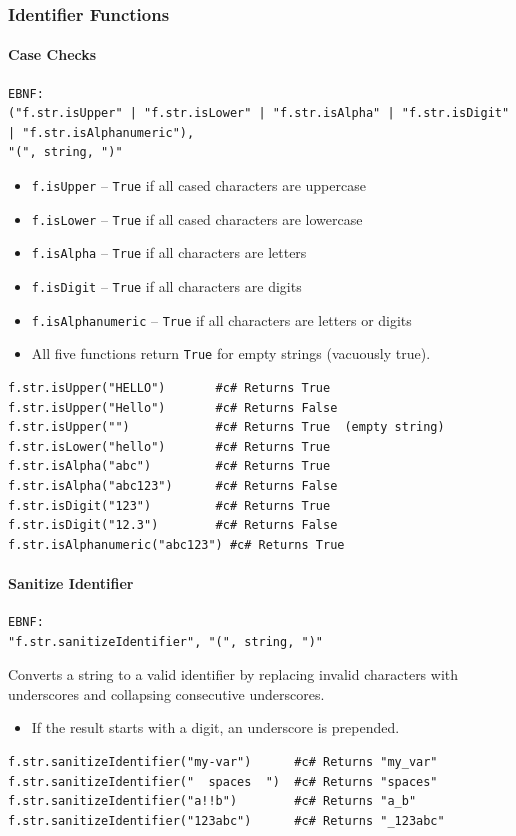 \subsubsection{Identifier Functions}
\paragraph{Case Checks}
\begin{verbatim}
EBNF:
("f.str.isUpper" | "f.str.isLower" | "f.str.isAlpha" | "f.str.isDigit" | "f.str.isAlphanumeric"),
"(", string, ")"
\end{verbatim}
\begin{itemize}
\item \texttt{f.isUpper} -- \texttt{True} if all cased characters are uppercase
\item \texttt{f.isLower} -- \texttt{True} if all cased characters are lowercase
\item \texttt{f.isAlpha} -- \texttt{True} if all characters are letters
\item \texttt{f.isDigit} -- \texttt{True} if all characters are digits
\item \texttt{f.isAlphanumeric} -- \texttt{True} if all characters are letters or digits
\item All five functions return \texttt{True} for empty strings (vacuously true).
\end{itemize}
\begin{verbatim}
f.str.isUpper("HELLO")       #c# Returns True
f.str.isUpper("Hello")       #c# Returns False
f.str.isUpper("")            #c# Returns True  (empty string)
f.str.isLower("hello")       #c# Returns True
f.str.isAlpha("abc")         #c# Returns True
f.str.isAlpha("abc123")      #c# Returns False
f.str.isDigit("123")         #c# Returns True
f.str.isDigit("12.3")        #c# Returns False
f.str.isAlphanumeric("abc123") #c# Returns True
\end{verbatim}

\paragraph{Sanitize Identifier}
\begin{verbatim}
EBNF:
"f.str.sanitizeIdentifier", "(", string, ")"
\end{verbatim}
Converts a string to a valid identifier by replacing invalid characters with underscores and collapsing consecutive underscores.
\begin{itemize}
\item If the result starts with a digit, an underscore is prepended.
\end{itemize}
\begin{verbatim}
f.str.sanitizeIdentifier("my-var")      #c# Returns "my_var"
f.str.sanitizeIdentifier("  spaces  ")  #c# Returns "spaces"
f.str.sanitizeIdentifier("a!!b")        #c# Returns "a_b"
f.str.sanitizeIdentifier("123abc")      #c# Returns "_123abc"
\end{verbatim}


